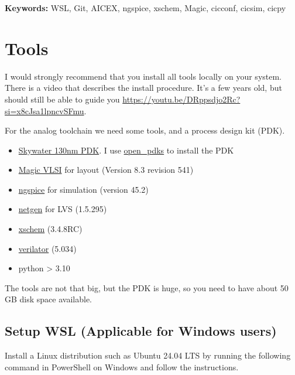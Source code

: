 \textbf{Keywords:} WSL, Git, AICEX, ngspice, xschem, Magic, cicconf,
cicsim, cicpy

\section{Tools}\label{tools}

I would strongly recommend that you install all tools locally on your
system. There is a video that describes the install procedure. It's a
few years old, but should still be able to guide you
\url{https://youtu.be/DRppsdjo2Rc?si=x8cJsa1lpncvSFmu}.

For the analog toolchain we need some tools, and a process design kit
(PDK).

\begin{itemize}
\tightlist
\item
  \href{https://github.com/google/skywater-pdk}{Skywater 130nm PDK}. I
  use \href{https://github.com/RTimothyEdwards/open_pdks}{open\_pdks} to
  install the PDK
\item
  \href{https://github.com/RTimothyEdwards/magic}{Magic VLSI} for layout
  (Version 8.3 revision 541)
\item
  \href{https://git.code.sf.net/p/ngspice/ngspice}{ngspice} for
  simulation (version 45.2)
\item
  \href{https://github.com/RTimothyEdwards/netgen.git}{netgen} for LVS
  (1.5.295)
\item
  \href{https://github.com/StefanSchippers/xschem}{xschem} (3.4.8RC)
\item
  \href{https://www.veripool.org/verilator/}{verilator} (5.034)
\item
  python \textgreater{} 3.10
\end{itemize}

The tools are not that big, but the PDK is huge, so you need to have
about 50 GB disk space available.

\subsection{Setup WSL (Applicable for Windows
users)}\label{setup-wsl-applicable-for-windows-users}

Install a Linux distribution such as Ubuntu 24.04 LTS by running the
following command in PowerShell on Windows and follow the instructions.

\begin{Shaded}
\begin{Highlighting}[]
  
\end{Highlighting}
\end{Shaded}

